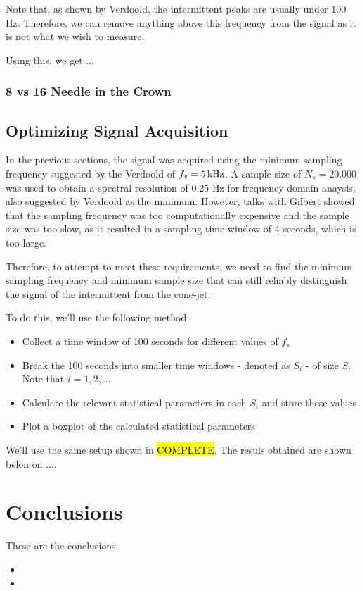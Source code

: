 \documentclass[oneside,12pt]{article}
\begin{document}
Note that, as shown by Verdoold, the intermittent peaks are usually under 100 Hz. Therefore, we can remove 
anything above this frequency from the signal as it is not what we wish to measure.

Using this, we get ...

\subsubsection{8 vs 16 Needle in the Crown}


\subsection{Optimizing Signal Acquisition}

In the previous sections, the signal was acquired using the minimum sampling frequency
suggested by the Verdoold of $f_s = 5 \,\mathrm{kHz}$. A sample size of $N_s = 20.000$ was used to obtain a spectral resolution of 0.25 Hz
for frequency domain anaysis, also suggested by Verdoold as the minimum. However, talks with Gilbert showed that the sampling frequency was too
computationally expensive and the sample size was too slow, as it resulted in a sampling time window of 4 seconds, which is too large.

Therefore, to attempt to meet these requirements, we need to find the minimum sampling frequency and
minimum sample size that can still reliably distinguish the signal of the intermittent from the cone-jet.

To do this, we'll use the following method:

\begin{itemize}
    \item Collect a time window of 100 seconds for different values of $f_s$
    \item Break the 100 seconds into smaller time windows - denoted as $S_i$ - of size $S$. Note that $i = 1, 2, ...$
    \item Calculate the relevant statistical parameters in each $S_i$ and store these values
    \item Plot a boxplot of the calculated statistical parameters
\end{itemize}

We'll use the same setup shown in \hl{COMPLETE}. The resuls obtained are shown belon on ....

\section{Conclusions} 

These are the conclusions:

\begin{itemize}
    \item \blindtext %
    \item \blindtext %
\end{itemize}


\newpage    \pagestyle{plain}

\end{document}
